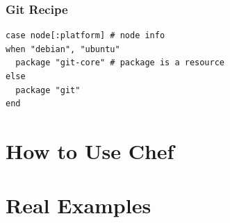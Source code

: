 \documentclass[xetex,mathserif,serif,12pt]{beamer}
\begin{document}
\begin{frame}[fragile]
  \frametitle{Git Recipe}
  \begin{beamer@nomargin}
  \begin{lstlisting}
case node[:platform] # node info
when "debian", "ubuntu"
  package "git-core" # package is a resource
else 
  package "git"
end
  \end{lstlisting}  
  \end{beamer@nomargin}
\end{frame}

\section{How to Use Chef}
\label{sec:how-use}

\section{Real Examples}
\label{sec:ex}
 
\end{document}
